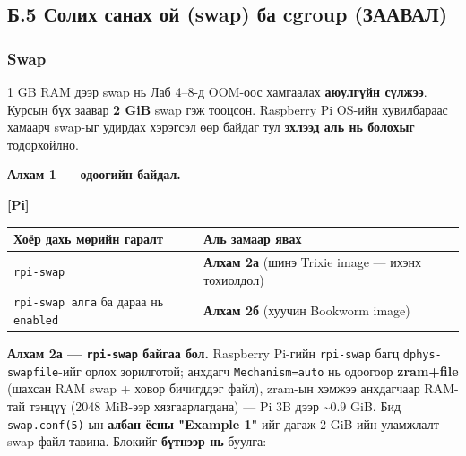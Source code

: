 \hypertarget{ux431.5-ux441ux43eux43bux438ux445-ux441ux430ux43dux430ux445-ux43eux439-swap-ux431ux430-cgroup-ux437ux430ux430ux432ux430ux43b}{%
\subsection{Б.5 Солих санах ой (swap) ба cgroup (ЗААВАЛ)}\label{ux431.5-ux441ux43eux43bux438ux445-ux441ux430ux43dux430ux445-ux43eux439-swap-ux431ux430-cgroup-ux437ux430ux430ux432ux430ux43b}}

\hypertarget{swap}{%
\subsubsection{Swap}\label{swap}}

1 GB RAM дээр swap нь Лаб 4--8-д OOM-оос хамгаалах \textbf{аюулгүйн сүлжээ}. Курсын бүх заавар \textbf{2 GiB} swap гэж тооцсон. Raspberry Pi OS-ийн хувилбараас хамаарч swap-ыг удирдах хэрэгсэл өөр байдаг тул \textbf{эхлээд аль нь болохыг} тодорхойлно.

\textbf{Алхам 1 --- одоогийн байдал.}

\textbf{{[}Pi{]}}

\begin{Shaded}
\begin{Highlighting}[]
\KeywordTok{;} 
\KeywordTok{\&\&}   \KeywordTok{||}  
\OperatorTok{2\textgreater{}}
\end{Highlighting}
\end{Shaded}

\begingroup\scriptsize\begin{longtable}[]{@{}ll@{}}
\toprule
Хоёр дахь мөрийн гаралт & Аль замаар явах\tabularnewline
\midrule
\endhead
\texttt{rpi-swap} & \textbf{Алхам 2а} (шинэ Trixie image --- ихэнх тохиолдол)\tabularnewline
\texttt{rpi-swap\ алга} ба дараа нь \texttt{enabled} & \textbf{Алхам 2б} (хуучин Bookworm image)\tabularnewline
\bottomrule
\end{longtable}\endgroup

\textbf{Алхам 2а --- \texttt{rpi-swap} байгаа бол.} Raspberry Pi-гийн \texttt{rpi-swap} багц \texttt{dphys-swapfile}-ийг орлох зорилготой; анхдагч \texttt{Mechanism=auto} нь одоогоор \textbf{zram+file} (шахсан RAM swap + ховор бичигддэг файл), zram-ын хэмжээ анхдагчаар RAM-тай тэнцүү (2048 MiB-ээр хязгаарлагдана) --- Pi 3B дээр \textasciitilde0.9 GiB. Бид \texttt{swap.conf(5)}-ын \textbf{албан ёсны "Example 1"}-ийг дагаж 2 GiB-ийн уламжлалт swap файл тавина. Блокийг \textbf{бүтнээр нь} буулга:

